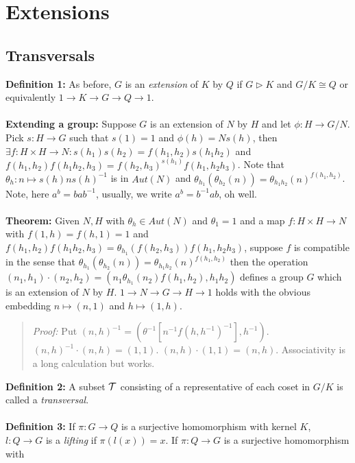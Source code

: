 \chapter{Extensions}
\section {Transversals} 
{\bf Definition 1:}
As before, $G$ is an \emph{extension} of $K$ by $Q$ if $G \triangleright K$ and $G/K \cong Q$
or equivalently $1 \rightarrow K \rightarrow G \rightarrow Q \rightarrow 1$.
\\
\\
{\bf Extending a group:}
Suppose $G$ is an extension of $N$ by $H$ and let $\phi: H \rightarrow G/N$.  Pick
$s:H \rightarrow G$ such that $s(1)=1$ and $\phi(h) = N s(h)$, then 
$\exists f: H \times H \rightarrow N: s(h_1) s(h_2)= f(h_1, h_2) s(h_1 h_2)$
and $f(h_1, h_2) f(h_1 h_2, h_3)= f(h_2, h_3)^{s(h_1)} f(h_1 , h_2 h_3)$.  Note
that $\theta_h: n \mapsto s(h) n s(h)^{-1}$ is in $Aut(N)$ and
$\theta_{h_1}(\theta_{h_2}(n))= \theta_{h_1 h_2}(n)^{f(h_1, h_2)}$.  Note, here $a^b = b a b^{-1}$, usually,
we write $a^b = b ^ {-1} a b$, oh well.
\\
\\
{\bf Theorem:}
Given $N,H$ with $\theta_h \in Aut(N)$ and $\theta_1 = 1$ and a map
$f: H \times H \rightarrow N$ with $f(1,h)=f(h,1)=1$ and
$f(h_1, h_2) f(h_1 h_2 , h_3)= \theta_{h_1}(f(h_2, h_3)) f(h_1, h_2 h_3)$, 
suppose $f$ is compatible in the sense that 
$\theta_{h_1}(\theta_{h_2}(n))= \theta_{h_1h_2}(n)^{f(h_1, h_2)}$ then the
operation $(n_1, h_1) \cdot (n_2, h_2) = (n_1 \theta_{h_1}(n_2) f(h_1, h_2), h_1 h_2)$
defines a group $G$ which is an extension of $N$ by $H$.  
$1 \rightarrow N \rightarrow G \rightarrow H \rightarrow 1$ holds with the obvious
embedding $n \mapsto (n,1)$ and $h \mapsto (1,h)$.
\begin{quote}
\emph{Proof:}  Put $(n,h)^{-1}= (\theta^{-1}[n^{-1} f(h,h^{-1})^{-1}], h^{-1})$.
$(n,h)^{-1} \cdot (n,h)= (1,1)$.   $(n,h) \cdot (1,1)= (n,h)$.  Associativity is a long
calculation but works.
\end{quote}
{\bf Definition 2:}
A subset ${\cal T}$ consisting of a representative of each coset
in $G/K$ is called a \emph{transversal}.
\\
\\
{\bf Definition 3:}
If $\pi: G \rightarrow Q$ is a surjective homomorphism with kernel
$K$, $l: Q \rightarrow G$ is a \emph{lifting} if $\pi(l(x))=x$.
If $\pi: Q \rightarrow G$ is a surjective homomorphism with

